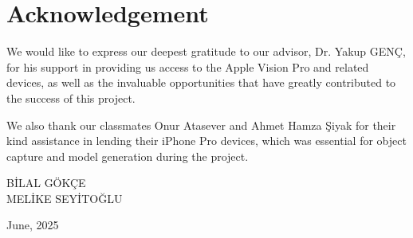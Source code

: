\chapter*{Acknowledgement}

We would like to express our deepest gratitude to our advisor, Dr. Yakup GENÇ, for his support in providing us access to the Apple Vision Pro and related devices, as well as the invaluable opportunities that have greatly contributed to the success of this project.

We also thank our classmates Onur Atasever and Ahmet Hamza Şiyak for their kind assistance in lending their iPhone Pro devices, which was essential for object capture and model generation during the project.

\vspace{1cm}
\begin{flushright}
    BİLAL GÖKÇE \\
    MELİKE SEYİTOĞLU \\
\end{flushright}
\begin{flushleft}
    June, 2025
\end{flushleft}
\clearpage